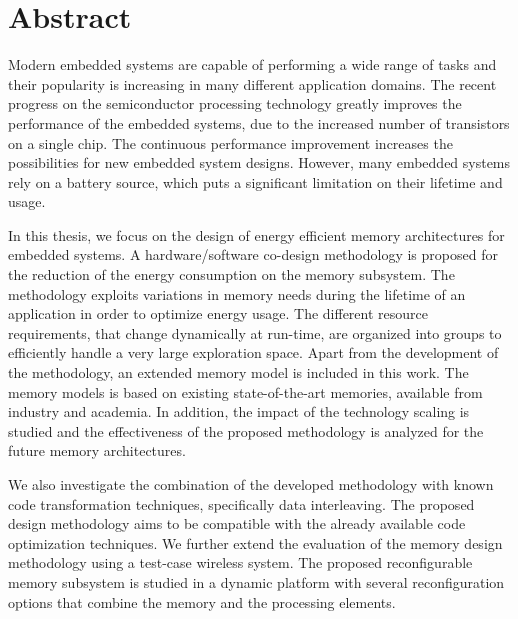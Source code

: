 \vspace*{\fill}
\section*{\hspace*{\fill} Abstract \hspace*{\fill}}

Modern embedded systems are capable of performing a wide range of tasks and their popularity is increasing in many different application domains.
The recent progress on the semiconductor processing technology greatly improves the performance of the embedded systems, due to the increased number of transistors on a single chip.
The continuous performance improvement increases the possibilities for new embedded system designs.
However, many embedded systems rely on a battery source, which puts a significant limitation on their lifetime and usage.

In this thesis, we focus on the design of energy efficient memory architectures for embedded systems.
A hardware/software co-design methodology is proposed for the reduction of the energy consumption on the memory subsystem. 
The  methodology exploits variations in memory needs during the lifetime of an application in order to optimize energy usage. 
The different resource requirements, that change dynamically at run-time, are organized into groups to efficiently handle a very large exploration space.
Apart from the development of the methodology, an extended memory model is included in this work. 
The memory models is based on existing state-of-the-art memories, available from industry and academia.
In addition, the impact of the technology scaling is studied and the effectiveness of the proposed methodology is analyzed for the future memory architectures.

We also investigate the combination of the developed methodology with known code transformation techniques, specifically data interleaving.
The proposed design methodology aims to be compatible with the already available code optimization techniques.
We further extend the evaluation of the memory design methodology using a test-case wireless system.
The proposed reconfigurable memory subsystem is studied in a dynamic platform with several reconfiguration options that combine the memory and the processing elements.
\vspace*{\fill}
\afterpage{\null\newpage}
\newpage


\vspace*{\fill}
